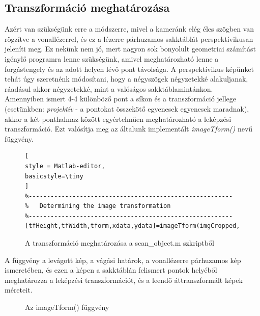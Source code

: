 \documentclass[12pt,a4paper]{article}
\begin{document}
\subsection{Transzformáció meghatározása}
Azért van szükségünk erre a módszerre, mivel a kameránk elég éles szögben van rögzítve a vonallézerrel, és ez a lézerre párhuzamos sakktáblát perspektívikusan jeleníti meg. Ez nekünk nem jó, mert nagyon sok bonyolult geometriai számítást igénylő programra lenne szükségünk, amivel meghatározható lenne a forgástengely és az adott helyen lévő pont távolsága. A perspektívikus képünket tehát úgy szeretnénk módosítani, hogy a négyszögek négyzetekké alakuljanak, ráadásul akkor négyzetekké, mint a valóságos sakktáblamintánkon.\\[10pt]
Amennyiben ismert 4-4 különböző pont a síkon és a transzformáció jellege (esetünkben: \textit{projektív} - a pontokat összekötő egyenesek egyenesek maradnak), akkor a két ponthalmaz között egyértelműen meghatározható a leképzési transzformáció. Ezt valósítja meg az általunk implementált \textit{imageTform()} nevű függvény.\\[10pt]
\begin{figure}[h!]
\centering
\begin{lstlisting}[
style = Matlab-editor,
basicstyle=\tiny
]
%--------------------------------------------------------
%   Determining the image transformation
%--------------------------------------------------------
[tfHeight,tfWidth,tform,xdata,ydata]=imageTform(imgCropped,rect,paralellImageNumber,cameraParams);
\end{lstlisting}
\caption{A transzformáció meghatározása a scan\_object.m szkriptből}
\end{figure}
A függvény a levágott kép, a vágási határok, a vonallézerre párhuzamos kép ismeretében, és ezen a képen a sakktáblán felismert pontok helyéből meghatározza a leképzési transzformációt, és a leendő áttranszformált képek méreteit.
\begin{figure}[h!]
\centering

\caption{Az imageTform() függvény}
\end{figure}

\end{document}

